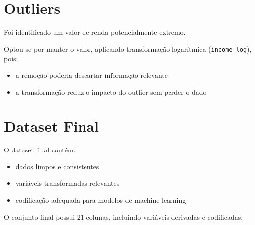 \documentclass[11pt]{article}
\begin{document}
\section{Outliers}
\label{sec:orgca111cc}
Foi identificado um valor de renda potencialmente extremo.

Optou-se por manter o valor, aplicando transformação logarítmica (\texttt{income\_log}), pois:
\begin{itemize}
\item a remoção poderia descartar informação relevante
\item a transformação reduz o impacto do outlier sem perder o dado
\end{itemize}
\section{Dataset Final}
\label{sec:org5ccc57a}
O dataset final contém:
\begin{itemize}
\item dados limpos e consistentes
\item variáveis transformadas relevantes
\item codificação adequada para modelos de machine learning
\end{itemize}

O conjunto final possui 21 colunas, incluindo variáveis derivadas e codificadas.
\end{document}
